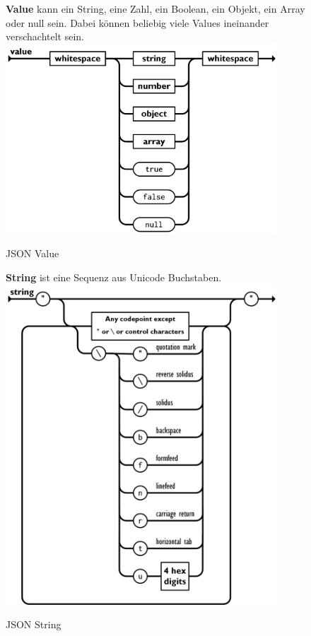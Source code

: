 \begin{figure}[H]
    \begin{minipage}[t]{0.45\textwidth}
        \textbf{Value} kann ein String, eine Zahl, ein Boolean, ein Objekt, ein Array oder null sein.
        Dabei können beliebig viele Values ineinander verschachtelt sein.
        \includegraphics[width=0.9\textwidth]{images/json_value}
        \caption{JSON Value}
        \label{fig:json_value}
    \end{minipage}\hfill
    \begin{minipage}[t]{0.45\textwidth}
        \flushleft\textbf{String} ist eine Sequenz aus Unicode Buchstaben.
        \includegraphics[width=0.9\textwidth]{images/json_string}
        \caption{JSON String}
        \label{fig:json_string}
    \end{minipage}\hfill
\end{figure}
